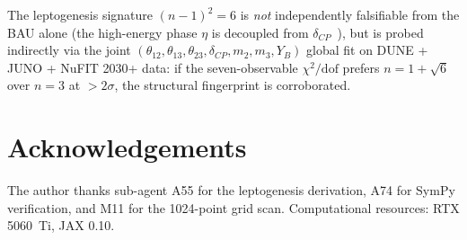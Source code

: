 \documentclass[aps,prl,twocolumn,showpacs,superscriptaddress]{revtex4-2}
\begin{document}
The leptogenesis signature $(n-1)^2=6$ is \emph{not} independently
falsifiable from the BAU alone (the high-energy phase $\eta$ is
decoupled from $\delta_{CP}$~\cite{KMSR18}), but is probed
indirectly via the joint
$(\theta_{12},\theta_{13},\theta_{23},\delta_{CP},m_2,m_3,Y_B)$
global fit on DUNE + JUNO + NuFIT 2030+ data: if the
seven-observable $\chi^2/\text{dof}$ prefers $n = 1+\sqrt{6}$
over $n = 3$ at $> 2\sigma$, the structural fingerprint is
corroborated.

\section*{Acknowledgements}

The author thanks sub-agent A55 for the leptogenesis derivation,
A74 for SymPy verification, and M11 for the 1024-point grid scan.
Computational resources: RTX 5060~Ti, JAX 0.10.
\end{document}
